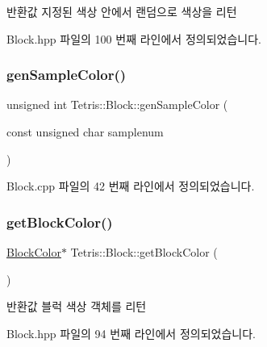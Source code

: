 \begin{DoxyReturn}{반환값}
지정된 색상 안에서 랜덤으로 색상을 리턴 
\end{DoxyReturn}


Block.\+hpp 파일의 100 번째 라인에서 정의되었습니다.

\mbox{\label{class_tetris_1_1_block_a9cac65704d2c788488ecf65d5b0467bd}} 
\subsubsection{\texorpdfstring{gen\+Sample\+Color()}{genSampleColor()}}
{\footnotesize\ttfamily unsigned int Tetris\+::\+Block\+::gen\+Sample\+Color (\begin{DoxyParamCaption}\item[{const unsigned char}]{samplenum }\end{DoxyParamCaption})}



Block.\+cpp 파일의 42 번째 라인에서 정의되었습니다.

\mbox{\label{class_tetris_1_1_block_ad61aea379870fbb3668d49e4c3c748ed}} 
\subsubsection{\texorpdfstring{get\+Block\+Color()}{getBlockColor()}}
{\footnotesize\ttfamily \hyperlink{class_tetris_1_1_block_sub_modules_1_1_block_color}{Block\+Color}$\ast$ Tetris\+::\+Block\+::get\+Block\+Color (\begin{DoxyParamCaption}{ }\end{DoxyParamCaption})\hspace{0.3cm}{\ttfamily [inline]}}

\begin{DoxyReturn}{반환값}
블럭 색상 객체를 리턴 
\end{DoxyReturn}


Block.\+hpp 파일의 94 번째 라인에서 정의되었습니다.


